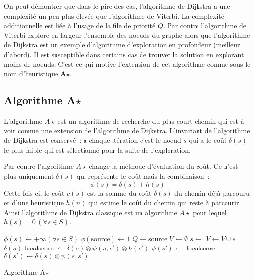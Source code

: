 \documentclass[11pt,openany]{book}
\newcommand{\kw}[1]{{\bf #1}} %
\begin{document}
On peut démontrer que dans le pire des cas, l'algorithme de Dijkstra a
une complexité un peu plus élevée que l'algorithme de Viterbi. 
La complexité additionnelle est liée à l'usage de la file de priorité
$Q$. 
Par
contre l'algorithme de Viterbi explore en largeur l'ensemble des
noeuds du graphe alors que l'algorithme de Dijkstra est un exemple
d'algorithme d'exploration en profondeur (meilleur d'abord). 
Il est susceptible dans certains cas de
trouver la solution en explorant moins de noeuds. 
C'est ce qui motive l'extension de cet algorithme connue sous le nom d'heuristique \kw{A$\star$}.

\subsection{Algorithme A$\star$}

L'algorithme $A\star$ est un algorithme de recherche du plus court
chemin qui est à voir comme une extension de l'algorithme de Dijkstra.
L'invariant de l'algorithme de
Dijkstra est conservé~: \`a chaque itération c'est le noeud $s$ qui a
le coût $\delta(s)$ le plus faible qui est sélectionné pour la suite de l'exploration.

Par contre l'algorithme $A\star$ change la méthode d'évaluation du
coût. Ce n'est plus uniquement $\delta(s)$ qui représente le coût mais la
combinaison~:
\begin{displaymath}
\phi(s) = \delta(s)+h(s)
\end{displaymath}
Cette fois-ci, le coût $c(s)$ est la somme du coût $\delta(s)$ du
chemin déjà parcouru et d'une heuristique $h(n)$ qui estime le coût du
chemin qui reste à parcourir.  Ainsi l'algorithme de Dijkstra classique est un algorithme $A\star$
pour lequel $h(s) = 0\, (\forall s \in S)$. 


\begin{algorithm}[htbp]
\begin{algorithmic}
\State $ \phi(s) \gets +\infty$\qquad$(\forall s \in S)$ 
\State $ \phi(\text{source}) \gets \bar{1}$ 
\State $Q \gets \text{source}$
\State $V \gets \emptyset$
    \State $s \gets$  
    \State $V \gets V \cup s$
        \State\Return $\delta(s)$
    \EndIf
        \State localscore $\gets \delta(s) \otimes \psi(s,s') \otimes h(s')$        
              \State $\phi(s') \gets$ localscore
              \State $\delta(s') \gets \delta(s) \otimes \psi(s,s')$ 
              \State {}
        \EndIf
        \EndIf
    \EndFor
\EndWhile
\EndFunction
\end{algorithmic}
\caption{\label{algo-astar-general}Algorithme A$\star$}
\end{algorithm}
\end{document}
